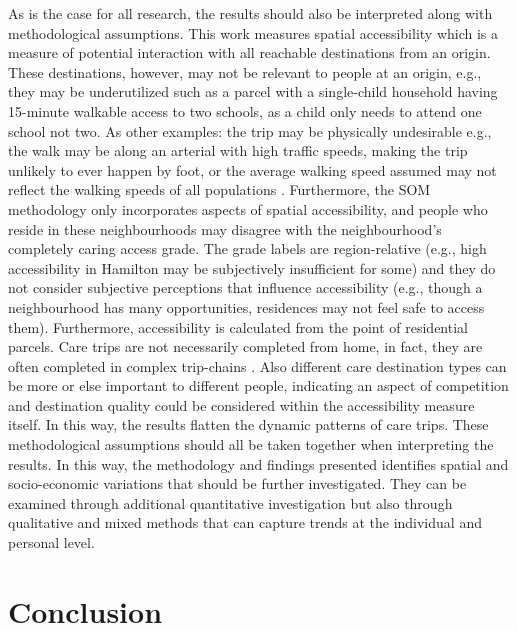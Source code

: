 \documentclass[
  authoryear,
  preprint,
  3p]{elsarticle}
\begin{document}
As is the case for all research, the results should also be interpreted
along with methodological assumptions. This work measures spatial
accessibility which is a measure of potential interaction with all
reachable destinations from an origin. These destinations, however, may
not be relevant to people at an origin, e.g., they may be underutilized
such as a parcel with a single-child household having 15-minute walkable
access to two schools, as a child only needs to attend one school not
two. As other examples: the trip may be physically undesirable e.g., the
walk may be along an arterial with high traffic speeds, making the trip
unlikely to ever happen by foot, or the average walking speed assumed
may not reflect the walking speeds of all populations
\citep{willberg15minuteCityAll2023}. Furthermore, the SOM methodology
only incorporates aspects of spatial accessibility, and people who
reside in these neighbourhoods may disagree with the neighbourhood's
completely caring access grade. The grade labels are region-relative
(e.g., high accessibility in Hamilton may be subjectively insufficient
for some) and they do not consider subjective perceptions that influence
accessibility (e.g., though a neighbourhood has many opportunities,
residences may not feel safe to access them). Furthermore, accessibility
is calculated from the point of residential parcels. Care trips are not
necessarily completed from home, in fact, they are often completed in
complex trip-chains \citep{scheinerWomenComplexDaily2015}. Also
different care destination types can be more or else important to
different people, indicating an aspect of competition and destination
quality could be considered within the accessibility measure itself. In
this way, the results flatten the dynamic patterns of care trips. These
methodological assumptions should all be taken together when
interpreting the results. In this way, the methodology and findings
presented identifies spatial and socio-economic variations that should
be further investigated. They can be examined through additional
quantitative investigation but also through qualitative and mixed
methods that can capture trends at the individual and personal level.

\section{Conclusion}\label{conclusion}
\end{document}
